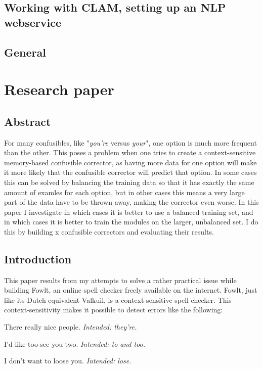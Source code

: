 \documentclass[12pt]{article}
\let\stdsection\section
\renewcommand\section{\newpage\stdsection}
\begin{document}
\subsection{Working with CLAM, setting up an NLP webservice}

\subsection{General}


\section{Research paper}

\subsection*{Abstract}

For many confusibles, like "\emph{you're} versus \emph{your}", one option is much more frequent than the other. This poses a problem when one tries to create a context-sensitive memory-based confusible corrector, as having more data for one option will make it more likely that the confusible corrector will predict that option. In some cases this can be solved by balancing the training data so that it has exactly the same amount of examles for each option, but in other cases this means a very large part of the data have to be thrown away, making the corrector even worse. In this paper I investigate in which cases it is better to use a balanced training set, and in which cases it is better to train the modules on the larger, unbalanced set. I do this by building x confusible correctors and evaluating their results.


\subsection{Introduction}

This paper results from my attempts to solve a rather practical issue while building Fowlt, an online spell checker freely available on the internet. Fowlt, just like its Dutch equivalent Valkuil, is a context-sensitive spell checker. This context-sensitivity makes it possible to detect errors like the following:

\begin{examples}

\item There really nice people. \emph{Intended: they're.}
\item I'd like too see you two. \emph{Intended: to and too.}
\item I don't want to loose you. \emph{Intended: lose.}

\end{examples}
\end{document}
